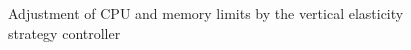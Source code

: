 \begin{figure}
    \centering
    
    \caption{Adjustment of CPU and memory limits by the vertical elasticity strategy controller}
    \label{fig:simple-limits-vertical}
\end{figure}

\begin{figure}
    \centering
    
    \caption{}
    \label{fig:utilization-vertical}
\end{figure}
